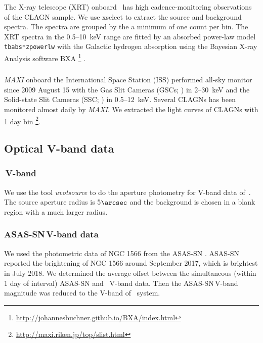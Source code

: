 \subsubsection{\xrt}
The X-ray telescope (XRT) onboard \swift\, has high cadence-monitoring observations of the CLAGN sample. We use {\sc xselect} to extract the source and background spectra. The spectra are grouped by the a minimum of one count per bin. The XRT spectra in the 0.5--10~keV range are fitted by an absorbed power-law model \texttt{tbabs*zpowerlw} with the Galactic hydrogen absorption using the Bayesian X-ray Analysis software BXA \footnote{\url{http://johannesbuchner.github.io/BXA/index.html}} \citep[][]{2014A&A...564A.125B}.


\subsubsection{\maxi}
\textit{MAXI} \citep{2009PASJ...61..999M} onboard the International Space Station (ISS) performed all-sky monitor since 2009 August 15 with the Gas Slit Cameras (GSCs; \citealt{2011PASJ...63S.623M}) 
  in 2--30~keV and the Solid-state Slit Cameras (SSC; \citealt{2011PASJ...63..397T}) in 0.5--12~keV. Several CLAGNs has been monitored almost daily by \textit{MAXI}.  We extracted the light curves of CLAGNs with 1 day bin \footnote{\url{http://maxi.riken.jp/top/slist.html}}. 

  


\subsection{Optical V-band data}
\subsubsection{\uvot\,V-band}
 We use the tool \textit{uvotsource} to do the aperture photometry for V-band data of \uvot\,. The source aperture radius is 5$\arcsec$ and the background is chosen in a blank region with a much larger radius.


\subsubsection{ASAS-SN\,V-band data}
We used the photometric data of NGC 1566 from the ASAS-SN \citep[All-sky Automated Survey for Supernovae,][]{2014ApJ...788...48S,2017PASP..129j4502K,2019MNRAS.485..961J}. ASAS-SN \citep[][]{2018ATel11893....1D} reported the brightening of NGC 1566 around September 2017, which is brightest in July 2018. We determined the average offset between the simultaneous (within 1 day of interval) ASAS-SN and \uvot\, V-band data. Then the ASAS-SN\,V-band magnitude was reduced to the V-band of \uvot\, system.




